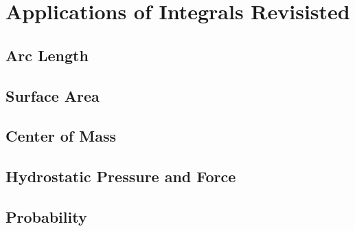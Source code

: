 \documentclass[../satmath.tex]{subfiles}
\begin{document}
\chapter{Applications of Integrals Revisisted}
\section{Arc Length}
\section{Surface Area}
\section{Center of Mass}
\section{Hydrostatic Pressure and Force}
\section{Probability}
\end{document}
